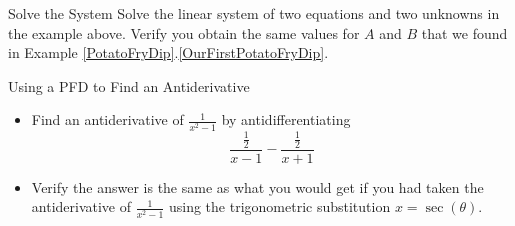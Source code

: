 \begin{exercise}{Solve the System \Coffeecup}
Solve the linear system of two equations and two unknowns in the example above.  Verify you obtain the same values for $A$ and $B$ that we found in Example \ref{PotatoFryDip}.\ref{OurFirstPotatoFryDip}.
\end{exercise}
\begin{exercise}{Using a PFD to Find an Antiderivative \Coffeecup \Coffeecup } \begin{itemize}
\item  Find an antiderivative of $\frac{1}{x^2-1}$ by antidifferentiating $$\frac{\frac{1}{2}}{x-1}-\frac{\frac{1}{2}}{x+1}$$
\item Verify the answer is the same as what you would get if you had taken the antiderivative of  $\frac{1}{x^2-1}$ using the trigonometric substitution $x=\sec(\theta)$.
\end{itemize}
\end{exercise}
